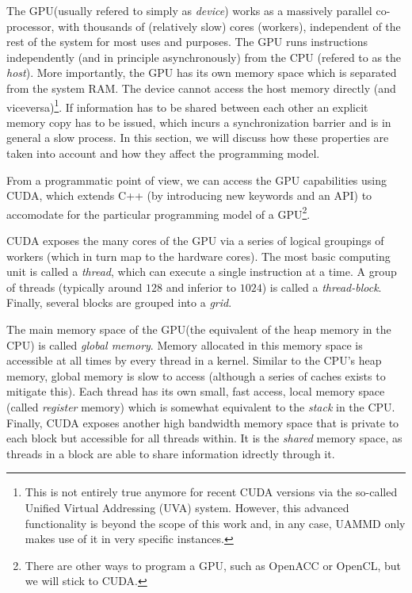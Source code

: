 \documentclass[ twoside,openright,titlepage,numbers=noenddot,%
headinclude,footinclude,cleardoublepage=empty,abstract=on,
BCOR=5mm,paper=a4,fontsize=11pt, dvipsnames
]{scrreprt}
\newcommand{\uammd}{\gls{UAMMD}\xspace}
\newcommand{\gpu}{\gls{GPU}\xspace}
\begin{document}
The \gpu (usually refered to simply as \emph{device}) works as a massively parallel co-processor, with thousands of (relatively slow) cores (workers), independent of the rest of the system for most uses and purposes. The \gpu runs instructions independently (and in principle asynchronously) from the CPU (refered to as the \emph{host}). More importantly, the \gpu has its own memory space which is separated from the system RAM. The device cannot access the host memory directly (and viceversa)\footnote{This is not entirely true anymore for recent CUDA versions via the so-called Unified Virtual Addressing (UVA) system. However, this advanced functionality is beyond the scope of this work and, in any case, \uammd only makes use of it in very specific instances.}. If information has to be shared between each other an explicit memory copy has to be issued, which incurs a synchronization barrier and is in general a slow process. In this section, we will discuss how these properties are taken into account and how they affect the programming model.

From a programmatic point of view, we can access the \gpu capabilities using CUDA, which extends C++ (by introducing new keywords and an \gls{API}) to accomodate for the particular programming model of a \gpu\footnote{There are other ways to program a \gpu, such as OpenACC\cite{openacc} or OpenCL\cite{Stone2010}, but we will stick to CUDA.}.

CUDA exposes the many cores of the \gpu via a series of logical groupings of workers (which in turn map to the hardware cores). The most basic computing unit is called a \emph{thread}, which can execute a single instruction at a time. A group of threads (typically around $128$ and inferior to $1024$) is called a \emph{thread-block}. Finally, several blocks are grouped into a \emph{grid}.

The main memory space of the \gpu (the equivalent of the heap memory in the CPU) is called \emph{global memory}. Memory allocated in this memory space is accessible at all times by every thread in a kernel. 
Similar to the CPU's heap memory, global memory is slow to access (although a series of caches exists to mitigate this).
Each thread has its own small, fast access, local memory space (called \emph{register} memory) which is somewhat equivalent to the \emph{stack} in the CPU.
Finally, CUDA exposes another high bandwidth memory space that is private to each block but accessible for all threads within. It is the \emph{shared} memory space, as threads in a block are able to share information idrectly through it.
\end{document}
